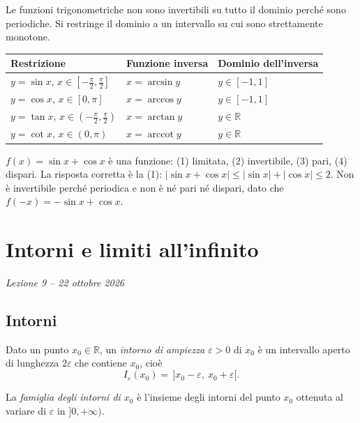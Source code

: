 \documentclass[11pt,a4paper]{article}
\begin{document}
Le funzioni trigonometriche non sono invertibili su tutto il dominio perché sono periodiche. Si restringe il dominio a un intervallo su cui sono strettamente monotone.
\begin{center}
\renewcommand{\arraystretch}{1.4}
\begin{tabular}{@{}lll@{}}
\toprule
Restrizione & Funzione inversa & Dominio dell'inversa \\
\midrule
$y = \sin x$, $x \in \left[-\frac{\pi}{2}, \frac{\pi}{2}\right]$ & $x = \arcsin y$ & $y \in [-1, 1]$ \\
$y = \cos x$, $x \in [0, \pi]$ & $x = \arccos y$ & $y \in [-1, 1]$ \\
$y = \tan x$, $x \in \left(-\frac{\pi}{2}, \frac{\pi}{2}\right)$ & $x = \arctan y$ & $y \in \mathbb{R}$ \\
$y = \cot x$, $x \in (0, \pi)$ & $x = \operatorname{arccot} y$ & $y \in \mathbb{R}$ \\
\bottomrule
\end{tabular}
\end{center}

\begin{esempio}[Test]
$f(x) = \sin x + \cos x$ è una funzione: (1) limitata, (2) invertibile, (3) pari, (4) dispari. La risposta corretta è la (1): $|\sin x + \cos x| \le |\sin x| + |\cos x| \le 2$. Non è invertibile perché periodica e non è né pari né dispari, dato che $f(-x) = -\sin x + \cos x$.
\end{esempio}

\section[Intorni e limiti all'infinito (Lezione 9 -- 22 ottobre 2026)]{Intorni e limiti all'infinito}
\noindent\emph{Lezione 9 -- 22 ottobre 2026}
\subsection{Intorni}

\begin{definizione}[Intorno]
Dato un punto $x_0 \in \mathbb{R}$, un \emph{intorno di ampiezza $\varepsilon > 0$} di $x_0$ è un intervallo aperto di lunghezza $2\varepsilon$ che contiene $x_0$, cioè
\[
I_\varepsilon(x_0) = \,]x_0 - \varepsilon,\ x_0 + \varepsilon[ .
\]
\end{definizione}

La \emph{famiglia degli intorni di $x_0$} è l'insieme degli intorni del punto $x_0$ ottenuta al variare di $\varepsilon$ in $]0, +\infty)$.
\end{document}
